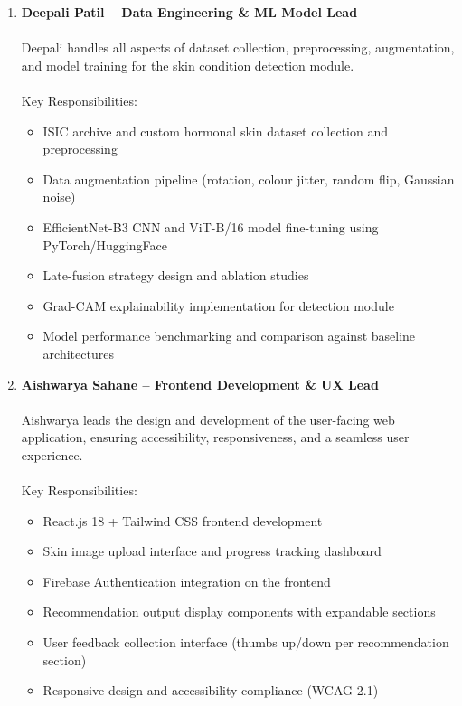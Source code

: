 \begin{enumerate}
    \item \textbf{Deepali Patil -- Data Engineering \& ML Model Lead}\\\\
    Deepali handles all aspects of dataset collection, preprocessing, augmentation, and model training for the skin condition detection module.\\\\
    Key Responsibilities:
    \begin{itemize}[label=$\diamond$]
        \item ISIC archive and custom hormonal skin dataset collection and preprocessing
        \item Data augmentation pipeline (rotation, colour jitter, random flip, Gaussian noise)
        \item EfficientNet-B3 CNN and ViT-B/16 model fine-tuning using PyTorch/HuggingFace
        \item Late-fusion strategy design and ablation studies
        \item Grad-CAM explainability implementation for detection module
        \item Model performance benchmarking and comparison against baseline architectures
    \end{itemize}
    \vspace{0.5cm}

    \item \textbf{Aishwarya Sahane -- Frontend Development \& UX Lead}\\\\
    Aishwarya leads the design and development of the user-facing web application, ensuring accessibility, responsiveness, and a seamless user experience.\\\\
    Key Responsibilities:
    \begin{itemize}[label=$\diamond$]
        \item React.js 18 + Tailwind CSS frontend development
        \item Skin image upload interface and progress tracking dashboard
        \item Firebase Authentication integration on the frontend
        \item Recommendation output display components with expandable sections
        \item User feedback collection interface (thumbs up/down per recommendation section)
        \item Responsive design and accessibility compliance (WCAG 2.1)
    \end{itemize}
\end{enumerate}
